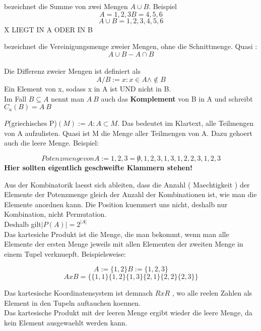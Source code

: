 \documentclass[headsepline,12pt,a4paper]{scrartcl}
\makeatletter
\def\myItem{%
   \@ifnextchar[ \@myItem{\@noitemargtrue\@myItem[\@itemlabel]}}
\def\@myItem[#1]{\item[#1]\mbox{}\\}
\makeatother
\begin{document}
\begin{itemize}
\myItem[Vereinigungsmenge]
 bezeichnet die Summe von zwei Mengen $ A \cup B $. Beispiel $$ A = {1,2,3} B = {4,5,6} $$
$$ A \cup B = {1,2,3,4,5,6} $$
 X LIEGT IN A ODER IN B 

\begin{center}
\myItem[Disjunkte]
\myItem[Vereinigungsmenge] 
\end{center}
 
bezeichnet die Vereinigungsmenge zweier Mengen, ohne die Schnittmenge. Quasi : 
$$ A \cup B - A \cap B $$ \\

\myItem[Differenz]
 Die Differenz zweier Mengen ist definiert als $$ A / B := { x : x \in A \wedge \not \in B} $$
Ein Element von x, sodass x in A ist UND nicht in B.\\
 Im Fall $ B \subseteq A $ nennt man $A \ B$ auch das \textbf{Komplement} von B in A und schreibt $C_a(B) = A \ B$
 

\myItem[Potenzmenge]
 $P$(griechisches P)$(M):= {A: A \subset M}$. Das bedeutet im Klartext, alle Teilmengen von A aufzulisten. Quasi ist M die Menge aller Teilmengen von A. Dazu gehoert auch die leere Menge. Beispiel:

$$ Potenzmenge von A:= {1,2,3} = {\not 0, 1,2,3, {1,3},{1,2}, {2,3},{1,2,3} }$$ \textbf{Hier sollten eigentlich geschweifte Klammern stehen!}

Aus der Kombinatorik laesst sich ableiten, dass die Anzahl ( Maechtigkeit ) der Elemente der Potenzmenge gleich der Anzahl der Kombinationen ist, wie man die Elemente anordnen kann. Die Position kuemmert uns nicht, deshalb nur Kombination, nicht Permutation.  \\

Deshalb gilt$ | P(A) |= 2^{|A|} $\\

\myItem[Kartesisches Produkt]
 Das kartesiche Produkt ist die Menge, die man bekommt, wenn man alle Elemente der ersten Menge jeweils mit allen Elementen der zweiten Menge in einem Tupel verknuepft. Beispielsweise: 

$$ A := \{1,2\} B:= \{1,2,3\}  $$
$$ A x B = \{ \{1,1\} \{1,2\} \{1,3\} \{2,1\} \{2,2\} \{2,3\} \} $$

Das kartesische Koordinatensystem ist demnach $ R x R $ , wo alle reelen Zahlen als Element in den Tupeln auftauchen koennen. \\

Das kartesische Produkt mit der leeren Menge ergibt wieder die leere Menge, da kein Element ausgewaehlt werden kann. \\


\end{itemize}
\end{document}
